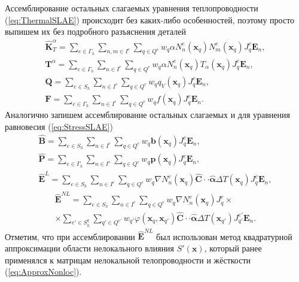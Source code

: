 Ассемблирование остальных слагаемых уравнения теплопроводности (\ref{eq:ThermalSLAE}) происходит без каких-либо особенностей, поэтому просто выпишем их без подробного разъяснения деталей
\begin{gather}
	\label{eq:HeatTransferMatrix}
	\widehat{\textbf{K}}^{\alpha}_T =
	\sum\limits_{e \in \Gamma_h}
	\sum\limits_{n,m \in I^{e}}
	\sum\limits_{q \in Q^e}
	w_q \alpha N_n^e (\boldsymbol{x}_q) N_m^e (\boldsymbol{x}_q) J_q^e \boldsymbol{E}_n,
	\\
	\label{eq:HeatTransferVector}
	\textbf{T}^{\alpha} =
	\sum\limits_{e \in \Gamma_h}
	\sum\limits_{n \in I^{e}}
	\sum\limits_{q \in Q^e}
	w_q \alpha N_n^e (\boldsymbol{x}_q) T_{\alpha} (\boldsymbol{x}_q) J_q^e \boldsymbol{E}_n,
	\\
	\label{eq:InnerFlux}
	\textbf{Q} =
	\sum\limits_{e \in S_h}
	\sum\limits_{n \in I^e}
	\sum\limits_{q \in Q^e}
	w_q q_V (\boldsymbol{x}_q) J_q^e \boldsymbol{E}_n,
	\\
	\label{eq:OuterFlux}
	\textbf{F} =
	\sum\limits_{e \in \Gamma_h}
	\sum\limits_{n \in I^e}
	\sum\limits_{q \in Q^e}
	w_q f (\boldsymbol{x}_q) J_q^e \boldsymbol{E}_n.
\end{gather}
Аналогично запишем ассемблирование остальных слагаемых и для уравнения равновесия (\ref{eq:StressSLAE})
\begin{gather}
	\label{eq:InnerPressure}
	\widehat{\textbf{B}} =
	\sum\limits_{e \in S_h}
	\sum\limits_{n \in I^e}
	\sum\limits_{q \in Q^e}
	w_q \boldsymbol{b} (\boldsymbol{x}_q) J_q^e \boldsymbol{E}_n,
	\\
	\label{eq:OuterPressure}
	\widehat{\textbf{P}} = 
	\sum\limits_{e \in \Gamma_h}
	\sum\limits_{n \in I^e}
	\sum\limits_{q \in Q^e}
	w_q \boldsymbol{p} (\boldsymbol{x}_q) J_q^e \boldsymbol{E}_n,
	\\
	\label{eq:LocalThermalExpansion}
	\widehat{\textbf{E}}^L = 
	\sum\limits_{e \in S_h}
	\sum\limits_{n \in I^e}
	\sum\limits_{q \in Q^e}
	w_q \nabla N_n^e (\boldsymbol{x}_q) \widehat{\mathbf{C}} \cdot \cdot \widehat{\boldsymbol{\alpha}} \Delta T (\boldsymbol{x}_q) J_q^e \boldsymbol{E}_n,
\end{gather}
\begin{multline}
	\label{eq:NonLocalThermalExpansion}
	\widehat{\textbf{E}}^{NL} = 
	\sum\limits_{e \in S_h}
	\sum\limits_{n \in I^e}
	\sum\limits_{q \in Q^e}
	w_q \nabla N_n^e (\boldsymbol{x}_q) J_q^e 
	\times \\ \times
	\sum\limits_{e' \in S_h^q}
	\sum\limits_{q' \in Q^{e'}}
	w_{q'} \varphi (\boldsymbol{x}_q, \boldsymbol{x}_{q'}) \widehat{\mathbf{C}} \cdot \cdot \widehat{\boldsymbol{\alpha}} \Delta T (\boldsymbol{x}_{q'}) J_{q'}^{e'} \boldsymbol{E}_n.
\end{multline}
Отметим, что при ассемблировании $\widehat{\textbf{E}}^{NL}$ был использован метод квадратурной аппроксимации области нелокального влияния $S'(\boldsymbol{x})$, который ранее применялся к матрицам нелокальной телопроводности и жёсткости (\ref{eq:ApproxNonloc}).


